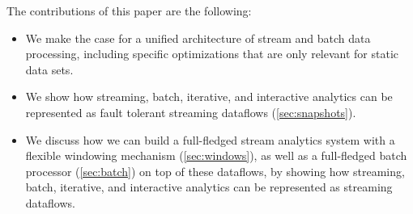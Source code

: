\noindent The contributions of this paper are the following:
\begin{itemize}
	\item We make the case for a unified architecture of stream and batch data processing, including specific optimizations that are only relevant for static data sets.
	\vspace{-3mm}
	\item We show how streaming, batch, iterative, and interactive analytics can be represented as fault tolerant streaming dataflows (\autoref{sec:snapshots}).
	\vspace{-3mm}
	\item We discuss how we can build a full-fledged stream analytics system with a flexible windowing mechanism (\autoref{sec:windows}), as well as a full-fledged batch processor (\autoref{sec:batch}) on top of these dataflows, by showing how streaming, batch, iterative, and interactive analytics can be represented as streaming dataflows.
\end{itemize}